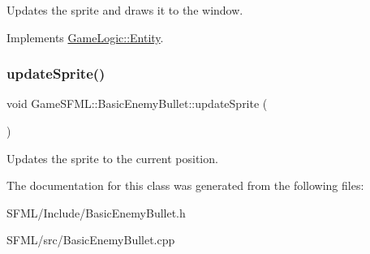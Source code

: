 Updates the sprite and draws it to the window. 

Implements \hyperlink{classGameLogic_1_1Entity_adf23a7036cb99dfc6e33434018131da4}{Game\+Logic\+::\+Entity}.

\mbox{\label{classGameSFML_1_1BasicEnemyBullet_a12e639b51bc2212fd35af3d8fb0bbb56}} 
\subsubsection{\texorpdfstring{update\+Sprite()}{updateSprite()}}
{\footnotesize\ttfamily void Game\+S\+F\+M\+L\+::\+Basic\+Enemy\+Bullet\+::update\+Sprite (\begin{DoxyParamCaption}{ }\end{DoxyParamCaption})}

Updates the sprite to the current position. 

The documentation for this class was generated from the following files\+:\begin{DoxyCompactItemize}
\item 
S\+F\+M\+L/\+Include/Basic\+Enemy\+Bullet.\+h\item 
S\+F\+M\+L/src/Basic\+Enemy\+Bullet.\+cpp\end{DoxyCompactItemize}
